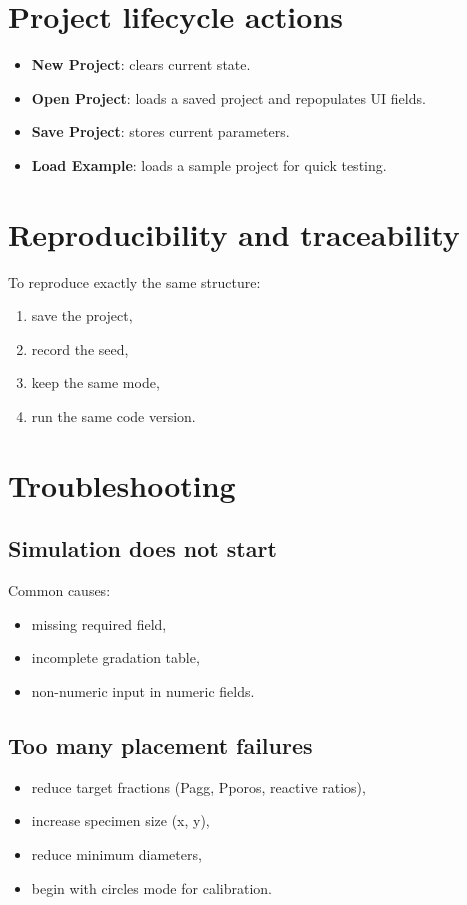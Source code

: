 \documentclass[11pt,a4paper]{article}
\begin{document}
\section{Project lifecycle actions}
\begin{itemize}[leftmargin=1.5em]
  \item \textbf{New Project}: clears current state.
  \item \textbf{Open Project}: loads a saved project and repopulates UI fields.
  \item \textbf{Save Project}: stores current parameters.
  \item \textbf{Load Example}: loads a sample project for quick testing.
\end{itemize}

\section{Reproducibility and traceability}
To reproduce exactly the same structure:
\begin{enumerate}[leftmargin=1.7em]
  \item save the project,
  \item record the seed,
  \item keep the same mode,
  \item run the same code version.
\end{enumerate}

\section{Troubleshooting}
\subsection{Simulation does not start}
Common causes:
\begin{itemize}[leftmargin=1.5em]
  \item missing required field,
  \item incomplete gradation table,
  \item non-numeric input in numeric fields.
\end{itemize}

\subsection{Too many placement failures}
\begin{itemize}[leftmargin=1.5em]
  \item reduce target fractions (Pagg, Pporos, reactive ratios),
  \item increase specimen size (x, y),
  \item reduce minimum diameters,
  \item begin with circles mode for calibration.
\end{itemize}
\end{document}
